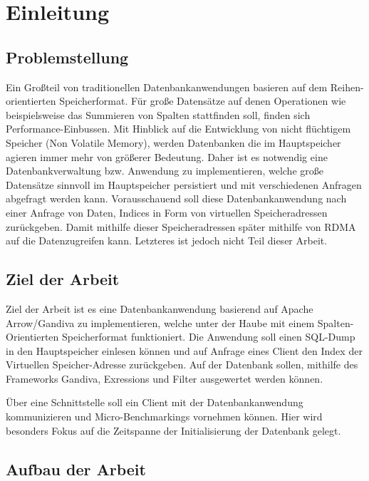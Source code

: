\chapter{Einleitung}

\section{Problemstellung}
Ein Großteil von traditionellen Datenbankanwendungen basieren auf dem Reihen-orientierten Speicherformat. Für große Datensätze auf denen Operationen wie beispielsweise das Summieren von Spalten stattfinden soll, finden sich Performance-Einbussen.
Mit Hinblick auf die Entwicklung von nicht flüchtigem Speicher (Non Volatile Memory), werden Datenbanken die im Hauptspeicher agieren immer mehr von größerer Bedeutung. Daher ist es notwendig eine Datenbankverwaltung bzw. Anwendung zu implementieren, welche große Datensätze sinnvoll im Hauptspeicher persistiert und mit verschiedenen Anfragen abgefragt werden kann.
Vorausschauend soll diese Datenbankanwendung nach einer Anfrage von Daten, Indices in Form von virtuellen Speicheradressen zurückgeben. Damit mithilfe dieser Speicheradressen später mithilfe von RDMA auf die Datenzugreifen kann. Letzteres ist jedoch nicht Teil dieser Arbeit. 


\section{Ziel der Arbeit}
Ziel der Arbeit ist es eine Datenbankanwendung basierend auf Apache Arrow/Gandiva zu implementieren, welche unter der Haube mit einem Spalten-Orientierten Speicherformat funktioniert. Die Anwendung soll einen SQL-Dump in den Hauptspeicher einlesen können und auf Anfrage eines Client den Index der Virtuellen Speicher-Adresse zurückgeben. Auf der Datenbank sollen, mithilfe des Frameworks Gandiva, Exressions und Filter ausgewertet werden können.

Über eine Schnittstelle soll ein Client mit der Datenbankanwendung kommunizieren und Micro-Benchmarkings vornehmen können. Hier wird besonders Fokus auf die Zeitspanne der Initialisierung der Datenbank gelegt.


\section{Aufbau der Arbeit}